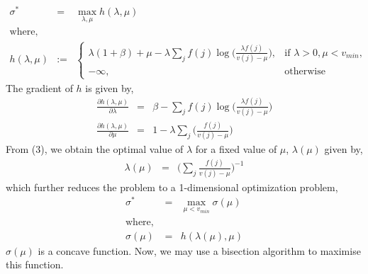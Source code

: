 \begin{eqnarray}
\sigma^* &=& \max_{\lambda, \mu} h(\lambda, \mu) \nonumber \\
\textrm{where,} \nonumber \\
h(\lambda, \mu) &:=& \begin{cases}
					 \lambda(1+\beta) + \mu - \lambda \sum_{j}f(j) \log\bigg(\frac{\lambda f(j)}{v(j) - \mu}\bigg), &\text{if } \lambda > 0, \mu < v_{min}, \\
					 -\infty, &\text{otherwise}
				     \end{cases}
\end{eqnarray}
The gradient of $h$ is given by, 
\begin{eqnarray}
\frac{\partial h(\lambda, \mu)}{\partial \lambda} &=& \beta - \sum_{j}f(j) \log\bigg(\frac{\lambda f(j)}{v(j) - \mu}\bigg) \\
\frac{\partial h(\lambda, \mu)}{\partial \mu} &=& 1 - \lambda \sum_{j} \bigg(\frac{f(j)}{v(j) - \mu}\bigg)
\end{eqnarray}
From (3), we obtain the optimal value of $\lambda$ for a fixed value of $\mu$, $\lambda(\mu)$ given by,
\begin{eqnarray*}
\lambda(\mu) &=& \bigg(\sum_{j}\frac{f(j)}{v(j) - \mu}\bigg)^{-1}
\end{eqnarray*}
which further reduces the problem to a 1-dimensional optimization problem,
\begin{eqnarray*}
\sigma^* &=& \max_{\mu < v_{min}} \sigma(\mu) \\
\textrm{where, } \\
\sigma(\mu) &=& h(\lambda(\mu), \mu)
\end{eqnarray*}
$\sigma(\mu)$ is a concave function. Now, we may use a bisection algorithm to maximise this function.

